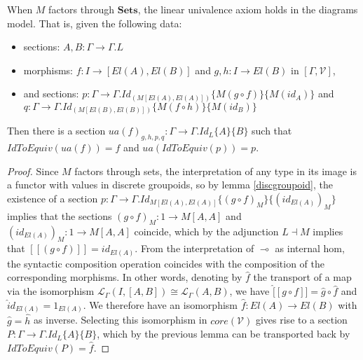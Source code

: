   \begin{thm}
    When $M$ factors through $\mathbf{Sets}$, the linear univalence axiom holds in the diagrams model. That is, given the following data:
    \begin{itemize}
    \item sections: $A, B : \Gamma \to \Gamma.L$
    \item morphisms: $f : I \to [El(A), El(B)]$ and $g, h : I \to El(B)$ in $[\Gamma, \mathcal{V}]$,
    \item and sections: $p : \Gamma \to \Gamma.Id_{(M[El(A),El(A)])}\{M(g \circ f)\}\{M(id_A)\}$ and $q : \Gamma \to \Gamma.Id_{(M[El(B),El(B)])}\{M(f \circ h)\}\{M(id_B)\}$
    \end{itemize}
    Then there is a section $ua(f)_{g, h, p, q} : \Gamma \to \Gamma.Id_L\{A\}\{B\}$ such that $IdToEquiv(ua(f)) = f$ and $ua(IdToEquiv(p)) = p$.
    \begin{proof}
      Since $M$ factors through sets, the interpretation of any type in its image is a functor with values in discrete groupoids, so by lemma \ref{discgroupoid}, the existence of a section $p : \Gamma \to \Gamma.Id_{M[El(A), El(A)]}\{(g \circ f)_M\}\{(id_{El(A)})_M\}$ implies that the sections $(g \circ f)_M : 1 \to M[A, A]$ and $(id_{El(A)})_M : 1 \to M[A,A]$ coincide, which by the adjunction $L \dashv M$ implies that $[[(g \circ f)]] = id_{El(A)}$. From the interpretation of $\multimap$ as internal hom, the syntactic composition operation coincides with the composition of the corresponding morphisms. In other words, denoting by $\hat f$ the transport of a map via the isomorphism $\mathcal{L}_\Gamma(I, [A,B]) \cong \mathcal{L}_\Gamma(A,B)$, we have $\hat [[g \circ f]] = \hat g \circ \hat f$ and $\hat id_{El(A)} = 1_{El(A)}$. We therefore have an isomorphism $\hat f : El(A) \to El(B)$ with $\hat g = \hat h$ as inverse. Selecting this isomorphism in $core(\mathcal{V})$ gives rise to a section $P : \Gamma \to \Gamma.Id_L\{A\}\{B\}$, which by the previous lemma can be transported back by $IdToEquiv(P) = \hat f$.
\end{proof}
\end{thm}
